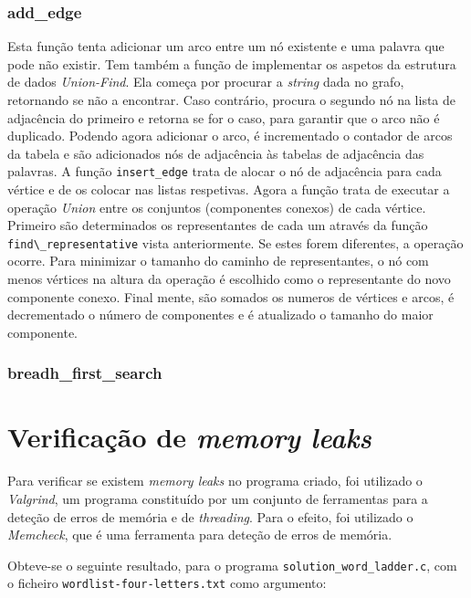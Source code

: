 \documentclass[portuguese,11pt,a4paper,titlepage]{article}
\newcommand{\foreign}[1]{\textit{#1}}
\begin{document}
\subsubsection{add\_edge}
Esta função tenta adicionar um arco entre um nó existente e uma palavra que pode não
existir. Tem também a função de implementar os aspetos da estrutura de dados
\foreign{Union-Find}. Ela começa por procurar a \foreign{string} dada no grafo,
retornando se não
a encontrar. Caso contrário, procura o segundo nó na lista de adjacência do primeiro e
retorna se for o caso, para garantir que o arco não é duplicado. Podendo agora adicionar
o arco, é incrementado o contador de arcos da tabela e são adicionados nós de adjacência
às tabelas de adjacência das palavras. A função \verb|insert_edge| trata de alocar o nó
de adjacência para cada vértice e de os colocar nas listas respetivas. Agora a função
trata de executar a operação \foreign{Union} entre os conjuntos (componentes conexos)
de cada vértice. Primeiro são determinados os representantes de cada um através da função
\verb|find\_representative| vista anteriormente. Se estes forem diferentes, a operação
ocorre. Para minimizar o tamanho do caminho de representantes, o nó com menos vértices
na altura da operação é escolhido como o representante do novo componente conexo. Final%
mente, são somados os numeros de vértices e arcos, é decrementado o número de componentes
e é atualizado o tamanho do maior componente.

\subsubsection{breadh\_first\_search}

\pagebreak
\section{Verificação de \textit{memory leaks}}
Para verificar se existem \textit{memory leaks} no programa criado, foi utilizado o \foreign{Valgrind}, um programa constituído por um conjunto de ferramentas para a deteção de erros de memória e de \foreign{threading}. Para o efeito, foi utilizado o \foreign{Memcheck}, que é uma ferramenta para deteção de erros de memória.

Obteve-se o seguinte resultado, para o programa \lstinline|solution_word_ladder.c|, com o ficheiro \lstinline|wordlist-four-letters.txt| como argumento:
\end{document}
